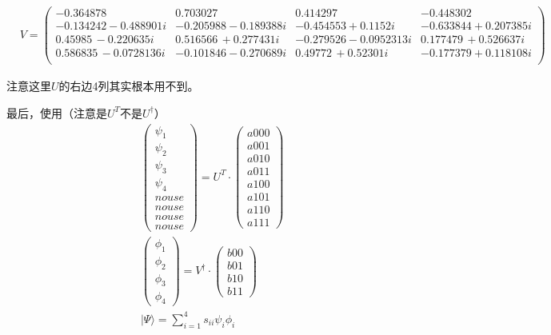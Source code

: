 \begin{equation}
\begin{split}
&V=\left(
    \begin{array}{cccc}
     -0.364878 & 0.703027 & 0.414297 & -0.448302 \\
     -0.134242-0.488901 i & -0.205988-0.189388 i & -0.454553+0.1152 i & -0.633844+0.207385 i \\
     0.45985\, -0.220635 i & 0.516566\, +0.277431 i & -0.279526-0.0952313 i & 0.177479\, +0.526637 i \\
     0.586835\, -0.0728136 i & -0.101846-0.270689 i & 0.49772\, +0.52301 i & -0.177379+0.118108 i \\
    \end{array}
    \right)
\end{split}
\end{equation}

注意这里$U$的右边4列其实根本用不到。


最后，使用（注意是$U^T$不是$U^{\dagger}$）
\begin{equation}
\begin{split}
&\begin{pmatrix} \psi _1 \\ \psi _2 \\ \psi _3 \\ \psi _4 \\ nouse \\ nouse \\ nouse \\ nouse \end{pmatrix}= U^T\cdot \begin{pmatrix} a000 \\ a001 \\ a010 \\ a011 \\ a100 \\ a101 \\ a110 \\ a111 \end{pmatrix}\\
&\begin{pmatrix} \phi _1 \\ \phi _2 \\ \phi _3 \\ \phi _4 \end{pmatrix}= V^{\dagger}\cdot \begin{pmatrix} b00 \\ b01 \\ b10 \\ b11  \end{pmatrix}\\
&|\Psi\rangle = \sum _{i=1}^4 s_{ii} \psi _i \phi _i\\
\end{split}
\end{equation}

